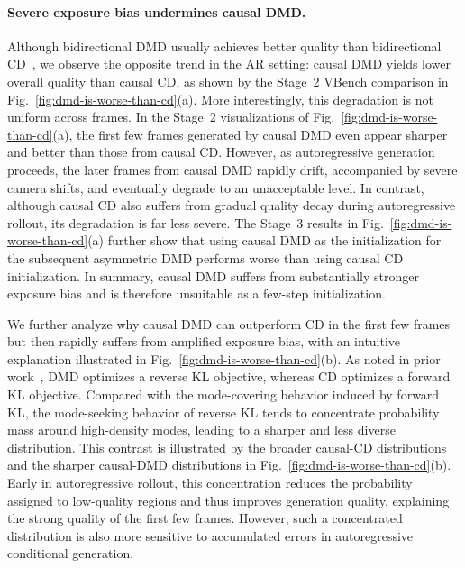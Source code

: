 \documentclass{llmxive}
\begin{document}
\paragraph{Severe exposure bias undermines causal DMD.}
Although bidirectional DMD usually achieves better quality than bidirectional CD~\cite{yin2024one,yin2024improved,zheng2025large}, we observe the opposite trend in the AR setting: causal DMD yields lower overall quality than causal CD, as shown by the Stage~2 VBench comparison in Fig.~\ref{fig:dmd-is-worse-than-cd}(a). More interestingly, this degradation is not uniform across frames. In the Stage~2 visualizations of Fig.~\ref{fig:dmd-is-worse-than-cd}(a), the first few frames generated by causal DMD even appear sharper and better than those from causal CD. However, as autoregressive generation proceeds, the later frames from causal DMD rapidly drift, accompanied by severe camera shifts, and eventually degrade to an unacceptable level. In contrast, although causal CD also suffers from gradual quality decay during autoregressive rollout, its degradation is far less severe. The Stage~3 results in Fig.~\ref{fig:dmd-is-worse-than-cd}(a) further show that using causal DMD as the initialization for the subsequent asymmetric DMD performs worse than using causal CD initialization. In summary, causal DMD suffers from substantially stronger exposure bias and is therefore unsuitable as a few-step initialization.

We further analyze why causal DMD can outperform CD in the first few frames but then rapidly suffers from amplified exposure bias, with an intuitive explanation illustrated in Fig.~\ref{fig:dmd-is-worse-than-cd}(b). As noted in prior work~\cite{zheng2025large}, DMD optimizes a reverse KL objective, whereas CD optimizes a forward KL objective. Compared with the mode-covering behavior induced by forward KL, the mode-seeking behavior of reverse KL tends to concentrate probability mass around high-density modes, leading to a sharper and less diverse distribution. This contrast is illustrated by the broader causal-CD distributions and the sharper causal-DMD distributions in Fig.~\ref{fig:dmd-is-worse-than-cd}(b). Early in autoregressive rollout, this concentration reduces the probability assigned to low-quality regions and thus improves generation quality, explaining the strong quality of the first few frames. However, such a concentrated distribution is also more sensitive to accumulated errors in autoregressive conditional generation.
\end{document}
